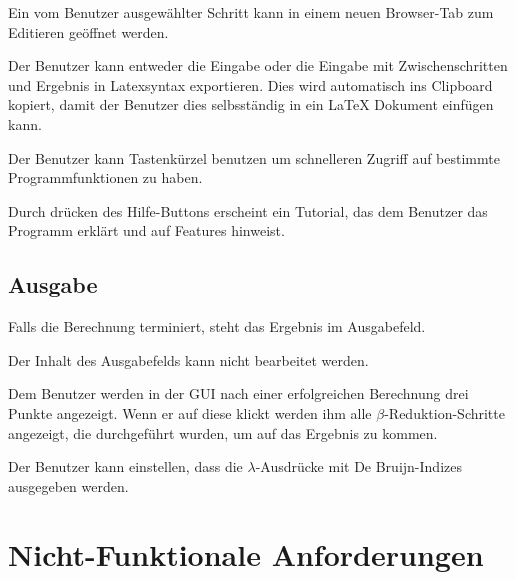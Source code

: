 \documentclass[parskip=full,11pt,twoside]{scrartcl}
\begin{document}
Ein vom Benutzer ausgewählter Schritt kann in einem neuen Browser-Tab zum Editieren geöffnet werden.

Der Benutzer kann entweder die Eingabe oder die Eingabe mit Zwischenschritten und Ergebnis in Latexsyntax exportieren. Dies wird automatisch ins Clipboard kopiert, damit der Benutzer dies selbsständig in ein LaTeX Dokument einfügen kann.

Der Benutzer kann Tastenkürzel benutzen um schnelleren Zugriff auf bestimmte Programmfunktionen zu haben.

Durch drücken des Hilfe-Buttons erscheint ein Tutorial, das dem Benutzer das Programm erklärt und auf Features hinweist.



\subsection{Ausgabe}

Falls die Berechnung terminiert, steht das Ergebnis im Ausgabefeld.

Der Inhalt des Ausgabefelds kann nicht bearbeitet werden.

Dem Benutzer werden in der GUI nach einer erfolgreichen Berechnung drei Punkte angezeigt. Wenn er auf diese klickt werden ihm alle $\beta$-Reduktion-Schritte angezeigt, die durchgeführt wurden, um auf das Ergebnis zu kommen.

Der Benutzer kann einstellen, dass die $\lambda$-Ausdrücke mit De Bruijn-Indizes ausgegeben werden.














\newpage
\section{Nicht-Funktionale Anforderungen}
\end{document}
